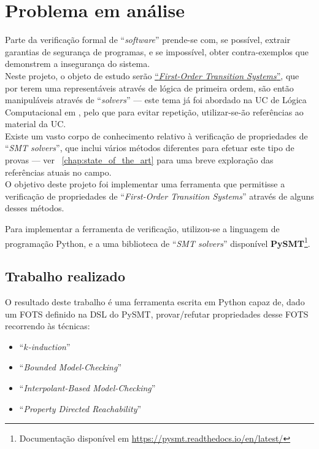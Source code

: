 \documentclass[11pt,a4paper]{report}%
\def\pdr{``\textit{Property Directed Reachability}''\xspace}
\def\bmc{``\textit{Bounded Model-Checking}''\xspace}
\def\imc{``\textit{Interpolant-Based Model-Checking}''\xspace}
\def\fotss{``\textit{First-Order Transition Systems}''\xspace}
\def\pysmt{\textbf{PySMT}}
\def\pysmtlink{\footnote{Documentação disponível em \url{https://pysmt.readthedocs.io/en/latest/}}}
\def\lc{Lógica Computacional\xspace}
\def\kind{``\textit{$k$-induction}''\xspace}
\begin{document}
\newpage
\section{Problema em análise}

Parte da verificação formal de ``\textit{software}'' prende-se com, se possível, extrair garantias
de segurança de programas, e se impossível, obter contra-exemplos que demonstrem
a insegurança do sistema.\\

Neste projeto, o objeto de estudo serão \href{https://paper.dropbox.com/doc/Capitulo-4-Sistemas-Hibridos-ycW40nf36f1eZW4f4k5e8#:uid=504559908351855556028836&h2=Defini%C3%A7%C3%A3o-e-descri%C3%A7%C3%A3o-dos-aut%C3%B3}{\fotss}, que por terem uma
representáveis através de lógica de primeira ordem, são então  manipuláveis
através de ``\textit{solvers}'' --- este tema já foi abordado na UC de \lc em
\cite{lc2122}, pelo que para evitar repetição, utilizar-se-ão referências ao material da UC.\\

Existe um vasto corpo de conhecimento relativo à verificação de propriedades de ``\textit{SMT solvers}'',
que inclui vários métodos diferentes para efetuar este tipo de provas --- ver ~\ref{chap:state_of_the_art}
para uma breve exploração das referências atuais no campo.\\

O objetivo deste projeto foi implementar uma ferramenta que permitisse a verificação de
propriedades de \fotss através de alguns desses métodos.

Para implementar a ferramenta de verificação, utilizou-se a linguagem de programação Python, e a
uma biblioteca de ``\textit{SMT solvers}'' disponível  \pysmt \pysmtlink.

\subsection{Trabalho realizado}

O resultado deste trabalho é uma ferramenta escrita em Python capaz de,
dado um FOTS definido na DSL do PySMT, provar/refutar propriedades desse FOTS
recorrendo às técnicas:

\begin{itemize}
    \item \kind
    \item \bmc
    \item \imc
    \item \pdr
\end{itemize}
\end{document}
